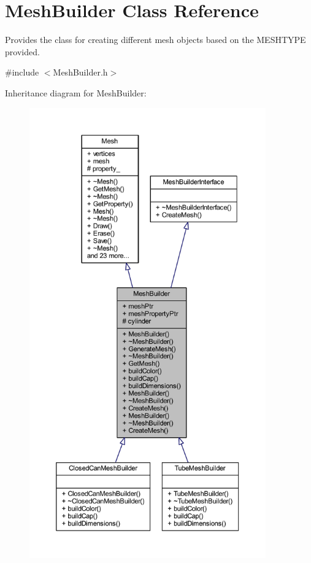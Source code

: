 \hypertarget{class_mesh_builder}{}\section{Mesh\+Builder Class Reference}
\label{class_mesh_builder}


Provides the class for creating different mesh objects based on the M\+E\+S\+H\+T\+Y\+PE provided.  




{\ttfamily \#include $<$Mesh\+Builder.\+h$>$}



Inheritance diagram for Mesh\+Builder\+:\nopagebreak
\begin{figure}[H]
\begin{center}
\leavevmode
\includegraphics[height=550pt]{class_mesh_builder__inherit__graph}
\end{center}
\end{figure}


